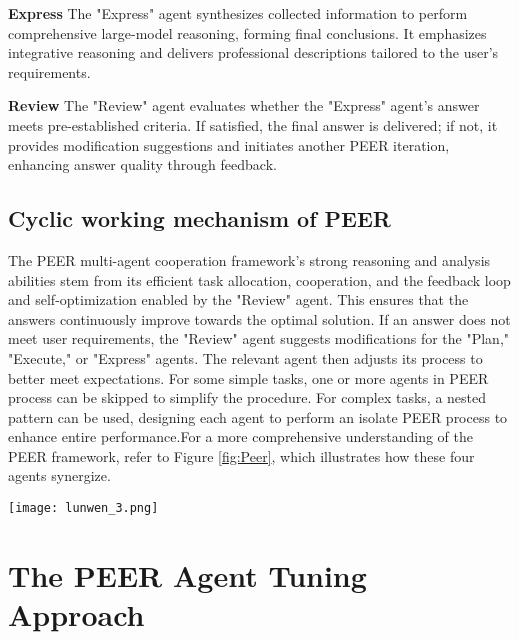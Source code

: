 \documentclass[11pt]{article}
\begin{document}
\textbf{Express}
The "Express" agent synthesizes collected information to perform comprehensive large-model reasoning, forming final conclusions. It emphasizes integrative reasoning and delivers professional descriptions tailored to the user's requirements.

\textbf{Review}
The "Review" agent evaluates whether the "Express" agent's answer meets pre-established criteria. If satisfied, the final answer is delivered; if not, it provides modification suggestions and initiates another PEER iteration, enhancing answer quality through feedback. 

\subsection{Cyclic working mechanism of PEER}
The PEER multi-agent cooperation framework’s strong reasoning and analysis abilities stem from its efficient task allocation, cooperation, and the feedback loop and self-optimization enabled by the "Review" agent. This ensures that the answers continuously improve towards the optimal solution. If an answer does not meet user requirements, the "Review" agent suggests modifications for the "Plan," "Execute," or "Express" agents. The relevant agent then adjusts its process to better meet expectations. For some simple tasks, one or more agents in PEER process can be skipped to simplify the procedure. For complex tasks, a nested pattern can be used, designing each agent to perform an isolate PEER process to enhance entire performance.For a more comprehensive understanding of the PEER framework, refer to Figure \ref{fig:Peer}, which illustrates how these four agents synergize.

\begin{figure*}[htbp]
\centering
\texttt{[image: lunwen\_3.png]}\\
\captionsetup{font = footnotesize}
\caption{Cyclic Workflow Diagram of the PEER Framework. The user's query, "Why did Buffett sell BYD stock?", prompts the "Plan" agent to generate four relevant sub-questions. The "Execute" agent then collects information, including BYD's financial data and expert opinions. The "Express" agent synthesizes a comprehensive answer, which the "Review" agent evaluates and, if necessary, suggests modifications.}
\label{fig:Peer}
\end{figure*}

\section{The PEER Agent Tuning Approach}
\label{sec:sec-3}
\end{document}
